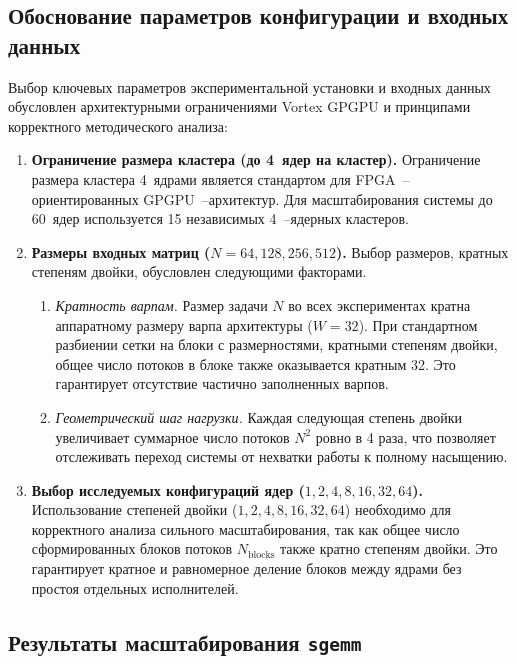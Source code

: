\documentclass[a4paper]{article}
\begin{document}
\subsection{Обоснование параметров конфигурации и входных данных}

Выбор ключевых параметров экспериментальной установки и входных данных обусловлен архитектурными ограничениями Vortex GPGPU и принципами корректного методического анализа:
\begin{enumerate}
    \item \textbf{Ограничение размера кластера (до 4~ядер на кластер).} 
    Ограничение размера кластера 4~ядрами является стандартом для FPGA~--ориентированных GPGPU~--архитектур. Для масштабирования системы до 60~ядер используется 15 независимых 4~--ядерных кластеров.

    \item \textbf{Размеры входных матриц ($N = 64, 128, 256, 512$).} 
    Выбор размеров, кратных степеням двойки, обусловлен следующими факторами.
    \begin{enumerate}
        \item \textit{Кратность варпам.} Размер задачи $N$ во всех экспериментах кратна аппаратному размеру варпа архитектуры ($W = 32$). При стандартном разбиении сетки на блоки с размерностями, кратными степеням двойки, общее число потоков в блоке также оказывается кратным 32. Это гарантирует отсутствие частично заполненных варпов.
        \item \textit{Геометрический шаг нагрузки.} Каждая следующая степень двойки увеличивает суммарное число потоков $N^2$ ровно в 4 раза, что позволяет отслеживать переход системы от нехватки работы к полному насыщению.
    \end{enumerate}

    \item \textbf{Выбор исследуемых конфигураций ядер ($1, 2, 4, 8, 16, 32, 64$).} 
    Использование степеней двойки ($1, 2, 4, 8, 16, 32, 64$) необходимо для корректного анализа сильного масштабирования, так как общее число сформированных блоков потоков $N_{\text{blocks}}$ также кратно степеням двойки. Это гарантирует кратное и равномерное деление блоков между ядрами без простоя отдельных исполнителей.
\end{enumerate}

\subsection{Результаты масштабирования \texttt{sgemm}}
\end{document}

